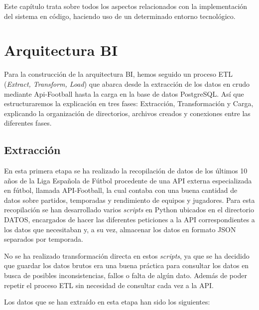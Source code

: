 

Este capítulo trata sobre todos los aspectos relacionados con la implementación del sistema en código, haciendo uso de un determinado entorno tecnológico.



\section{Arquitectura BI}
Para la construcción de la arquitectura BI, hemos seguido un proceso ETL (\textit{Extract, Transform, Load}) que abarca desde la extracción de los datos en crudo mediante Api-Football hasta la carga en la base de datos PostgreSQL. Así que estructuraremos la explicación en tres fases: Extracción, Transformación y Carga, explicando la organización de directorios, archivos creados y conexiones entre las diferentes fases.
\subsection{Extracción}

En esta primera etapa se ha realizado la recopilación de datos de los últimos 10 años de la Liga Española de Fútbol procedente de una API externa especializada en fútbol, llamada API-Football, la cual contaba con una buena cantidad de datos sobre partidos, temporadas y rendimiento de equipos y jugadores. Para esta recopilación se han desarrollado varios \textit{scripts} en Python ubicados en el directorio DATOS, encargados de hacer las diferentes peticiones a la API correspondientes a los datos que necesitaban y, a su vez, almacenar los datos en formato JSON separados por temporada.

No se ha realizado transformación directa en estos \textit{scripts}, ya que se ha decidido que guardar los datos brutos era una buena práctica para consultar los datos en busca de posibles inconsistencias, fallos o falta de algún dato. Además de poder repetir el proceso ETL sin necesidad de consultar cada vez a la API.

Los datos que se han extraído en esta etapa han sido los siguientes:

